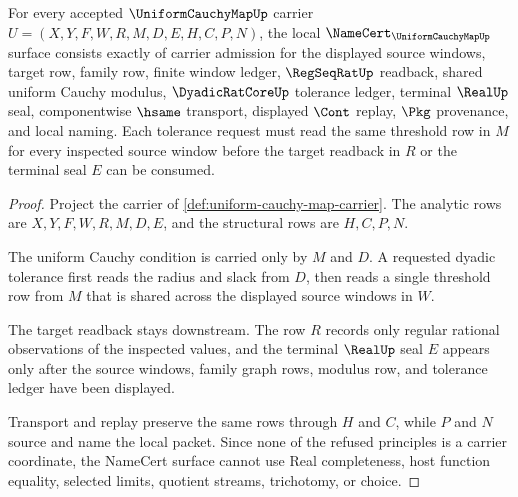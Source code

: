 \begin{theorem}
\label{thm:uniform-cauchy-map-namecert-obligations}
For every accepted $\UniformCauchyMapUp$ carrier $U=(X,Y,F,W,R,M,D,E,H,C,P,N)$, the local $\NameCert_{\UniformCauchyMapUp}$ surface consists exactly of carrier admission for the displayed source windows, target row, family row, finite window ledger, $\RegSeqRatUp$ readback, shared uniform Cauchy modulus, $\DyadicRatCoreUp$ tolerance ledger, terminal $\RealUp$ seal, componentwise $\hsame$ transport, displayed $\Cont$ replay, $\Pkg$ provenance, and local naming. Each tolerance request must read the same threshold row in $M$ for every inspected source window before the target readback in $R$ or the terminal seal $E$ can be consumed.
\end{theorem}
\begin{proof}
Project the carrier of \autoref{def:uniform-cauchy-map-carrier}. The analytic rows are $X,Y,F,W,R,M,D,E$, and the structural rows are $H,C,P,N$.

The uniform Cauchy condition is carried only by $M$ and $D$. A requested dyadic tolerance first reads the radius and slack from $D$, then reads a single threshold row from $M$ that is shared across the displayed source windows in $W$.

The target readback stays downstream. The row $R$ records only regular rational observations of the inspected values, and the terminal $\RealUp$ seal $E$ appears only after the source windows, family graph rows, modulus row, and tolerance ledger have been displayed.

Transport and replay preserve the same rows through $H$ and $C$, while $P$ and $N$ source and name the local packet. Since none of the refused principles is a carrier coordinate, the NameCert surface cannot use Real completeness, host function equality, selected limits, quotient streams, trichotomy, or choice.
\end{proof}

